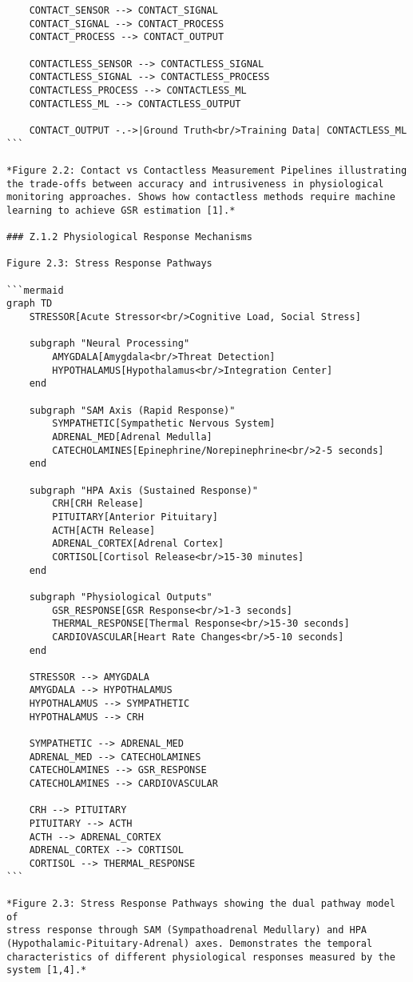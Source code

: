 \begin{verbatim}
    CONTACT_SENSOR --> CONTACT_SIGNAL
    CONTACT_SIGNAL --> CONTACT_PROCESS
    CONTACT_PROCESS --> CONTACT_OUTPUT

    CONTACTLESS_SENSOR --> CONTACTLESS_SIGNAL
    CONTACTLESS_SIGNAL --> CONTACTLESS_PROCESS
    CONTACTLESS_PROCESS --> CONTACTLESS_ML
    CONTACTLESS_ML --> CONTACTLESS_OUTPUT

    CONTACT_OUTPUT -.->|Ground Truth<br/>Training Data| CONTACTLESS_ML
```

*Figure 2.2: Contact vs Contactless Measurement Pipelines illustrating the trade-offs between accuracy and intrusiveness in physiological monitoring approaches. Shows how contactless methods require machine learning to achieve GSR estimation [1].*

### Z.1.2 Physiological Response Mechanisms

Figure 2.3: Stress Response Pathways

```mermaid
graph TD
    STRESSOR[Acute Stressor<br/>Cognitive Load, Social Stress]

    subgraph "Neural Processing"
        AMYGDALA[Amygdala<br/>Threat Detection]
        HYPOTHALAMUS[Hypothalamus<br/>Integration Center]
    end

    subgraph "SAM Axis (Rapid Response)"
        SYMPATHETIC[Sympathetic Nervous System]
        ADRENAL_MED[Adrenal Medulla]
        CATECHOLAMINES[Epinephrine/Norepinephrine<br/>2-5 seconds]
    end

    subgraph "HPA Axis (Sustained Response)"
        CRH[CRH Release]
        PITUITARY[Anterior Pituitary]
        ACTH[ACTH Release]
        ADRENAL_CORTEX[Adrenal Cortex]
        CORTISOL[Cortisol Release<br/>15-30 minutes]
    end

    subgraph "Physiological Outputs"
        GSR_RESPONSE[GSR Response<br/>1-3 seconds]
        THERMAL_RESPONSE[Thermal Response<br/>15-30 seconds]
        CARDIOVASCULAR[Heart Rate Changes<br/>5-10 seconds]
    end

    STRESSOR --> AMYGDALA
    AMYGDALA --> HYPOTHALAMUS
    HYPOTHALAMUS --> SYMPATHETIC
    HYPOTHALAMUS --> CRH

    SYMPATHETIC --> ADRENAL_MED
    ADRENAL_MED --> CATECHOLAMINES
    CATECHOLAMINES --> GSR_RESPONSE
    CATECHOLAMINES --> CARDIOVASCULAR

    CRH --> PITUITARY
    PITUITARY --> ACTH
    ACTH --> ADRENAL_CORTEX
    ADRENAL_CORTEX --> CORTISOL
    CORTISOL --> THERMAL_RESPONSE
```

*Figure 2.3: Stress Response Pathways showing the dual pathway model of
stress response through SAM (Sympathoadrenal Medullary) and HPA
(Hypothalamic-Pituitary-Adrenal) axes. Demonstrates the temporal
characteristics of different physiological responses measured by the
system [1,4].*


\end{verbatim}
